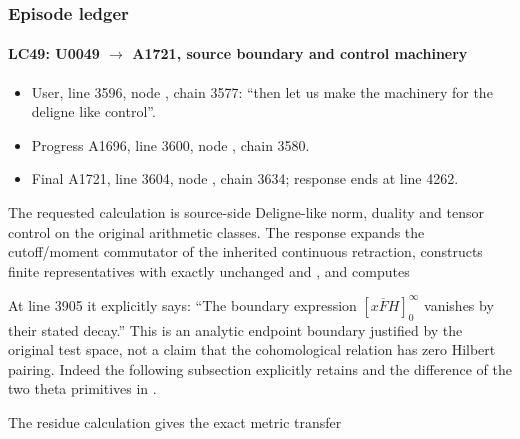 \subsubsection{Episode ledger}\label{episode-ledger}

\paragraph{\texorpdfstring{LC49: U0049
\allowbreak{}\ensuremath{→}\allowbreak{} A1721, source boundary and
control
machinery}{LC49: U0049  A1721, source boundary and control machinery}}\label{lc49-u0049-a1721-source-boundary-and-control-machinery}

\begin{itemize}
\tightlist
\item
  User, line 3596, node
  \protect{}, chain 3577:
  ``then let us make the machinery for the deligne like control''.
\item
  Progress A1696, line 3600, node
  \protect{}, chain 3580.
\item
  Final A1721, line 3604, node
  \protect{}, chain 3634;
  response ends at line 4262.
\end{itemize}

The requested calculation is source-side Deligne-like norm, duality and
tensor control on the original arithmetic classes. The response expands
the cutoff/moment commutator of the inherited continuous retraction,
constructs finite representatives \protect{} with
exactly unchanged \protect{} and \protect{},
and computes


At line 3905 it explicitly says: ``The boundary expression
\([x\overline F H]_0^\infty\) vanishes by their stated decay.'' This is
an analytic endpoint boundary justified by the original test space, not
a claim that the cohomological relation \protect{} has zero
Hilbert pairing. Indeed the following subsection explicitly retains
\protect{} and the difference of the two theta primitives in
\protect{}.

The residue calculation \protect{} gives the exact metric
transfer


